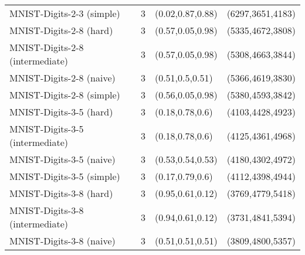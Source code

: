 \begin{tabular}{llll}
                       MNIST-Digits-2-3 (simple) &              3 &                                    (0.02,0.87,0.88) &                                               (6297,3651,4183) \\
                         MNIST-Digits-2-8 (hard) &              3 &                                    (0.57,0.05,0.98) &                                               (5335,4672,3808) \\
                 MNIST-Digits-2-8 (intermediate) &              3 &                                    (0.57,0.05,0.98) &                                               (5308,4663,3844) \\
                        MNIST-Digits-2-8 (naive) &              3 &                                     (0.51,0.5,0.51) &                                               (5366,4619,3830) \\
                       MNIST-Digits-2-8 (simple) &              3 &                                    (0.56,0.05,0.98) &                                               (5380,4593,3842) \\
                         MNIST-Digits-3-5 (hard) &              3 &                                     (0.18,0.78,0.6) &                                               (4103,4428,4923) \\
                 MNIST-Digits-3-5 (intermediate) &              3 &                                     (0.18,0.78,0.6) &                                               (4125,4361,4968) \\
                        MNIST-Digits-3-5 (naive) &              3 &                                    (0.53,0.54,0.53) &                                               (4180,4302,4972) \\
                       MNIST-Digits-3-5 (simple) &              3 &                                     (0.17,0.79,0.6) &                                               (4112,4398,4944) \\
                         MNIST-Digits-3-8 (hard) &              3 &                                    (0.95,0.61,0.12) &                                               (3769,4779,5418) \\
                 MNIST-Digits-3-8 (intermediate) &              3 &                                    (0.94,0.61,0.12) &                                               (3731,4841,5394) \\
                        MNIST-Digits-3-8 (naive) &              3 &                                    (0.51,0.51,0.51) &                                               (3809,4800,5357) \\

\end{tabular}
